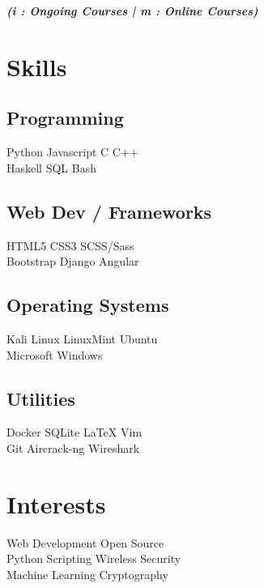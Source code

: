 \documentclass[]{deedy-resume-openfont}
\begin{document}
\begin{minipage}[t]{0.33\textwidth}
{\footnotesize \textit{\textbf{ (i : Ongoing Courses | m : Online Courses)}}}


\section{Skills}
\subsection{Programming}
Python \textbullet{} Javascript \textbullet{} C \textbullet{} C++ \\  
 \vspace{0.1 cm}
Haskell \textbullet{} SQL \textbullet{} Bash \\
\vspace{0.3 cm} 
\subsection{Web Dev / Frameworks}
HTML5 \textbullet{} CSS3 \textbullet{}  SCSS/Sass \\ 
Bootstrap \textbullet{} Django \textbullet{} Angular \\
\vspace{0.3 cm}
\subsection{Operating Systems}
Kali Linux \textbullet{} LinuxMint \textbullet{} Ubuntu \\
Microsoft Windows
\vspace{0.3 cm}
\subsection{Utilities}
Docker \textbullet{} SQLite \textbullet{} \LaTeX{} \textbullet{} Vim \\
Git \textbullet{} Aircrack-ng \textbullet{} Wireshark \\


\section{Interests}
Web Development \textbullet{}Open Source \\
Python Scripting \textbullet{} Wireless Security \\
Machine Learning  \textbullet{} Cryptography\\
%
%

\end{minipage} 
\end{document}
